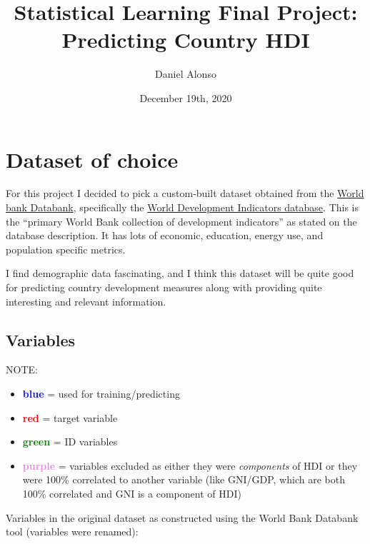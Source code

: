 \documentclass[]{article}
\title{Statistical Learning Final Project: Predicting Country HDI}
\author{Daniel Alonso}
\date{December 19th, 2020}
\providecommand{\tightlist}{%
  \setlength{\itemsep}{0pt}\setlength{\parskip}{0pt}}
\begin{document}
\maketitle

{
\setcounter{tocdepth}{4}
\tableofcontents
}
\newpage

\hypertarget{dataset-of-choice}{%
\section{Dataset of choice}\label{dataset-of-choice}}

For this project I decided to pick a custom-built dataset obtained from
the \href{https://databank.worldbank.org/home.aspx}{World bank
Databank}, specifically the
\href{https://databank.worldbank.org/source/world-development-indicators}{World
Development Indicators database}. This is the ``primary World Bank
collection of development indicators'' as stated on the database
description. It has lots of economic, education, energy use, and
population specific metrics.

I find demographic data fascinating, and I think this dataset will be
quite good for predicting country development measures along with
providing quite interesting and relevant information.

\hypertarget{variables}{%
\subsection{Variables}\label{variables}}

\large

NOTE: \normalsize

\begin{itemize}
\tightlist
\item
  \textbf{\textcolor{blue}{blue}} = used for training/predicting
\item
  \textbf{\textcolor{red}{red}} = target variable
\item
  \textbf{\textcolor{green}{green}} = ID variables
\item
  \textbf{\textcolor{violet}{purple}} = variables excluded as either
  they were \emph{components} of HDI or they were 100\% correlated to
  another variable (like GNI/GDP, which are both 100\% correlated and
  GNI is a component of HDI)
\end{itemize}

Variables in the original dataset as constructed using the World Bank
Databank tool (variables were renamed):
\end{document}
